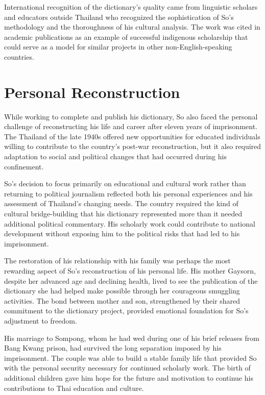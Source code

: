 \documentclass[
  Letterpaper,
]{scrbook}
\begin{document}
International recognition of the dictionary's quality came from
linguistic scholars and educators outside Thailand who recognized the
sophistication of So's methodology and the thoroughness of his cultural
analysis. The work was cited in academic publications as an example of
successful indigenous scholarship that could serve as a model for
similar projects in other non-English-speaking countries.

\section{Personal Reconstruction}\label{personal-reconstruction}

While working to complete and publish his dictionary, So also faced the
personal challenge of reconstructing his life and career after eleven
years of imprisonment. The Thailand of the late 1940s offered new
opportunities for educated individuals willing to contribute to the
country's post-war reconstruction, but it also required adaptation to
social and political changes that had occurred during his confinement.

So's decision to focus primarily on educational and cultural work rather
than returning to political journalism reflected both his personal
experiences and his assessment of Thailand's changing needs. The country
required the kind of cultural bridge-building that his dictionary
represented more than it needed additional political commentary. His
scholarly work could contribute to national development without exposing
him to the political risks that had led to his imprisonment.

The restoration of his relationship with his family was perhaps the most
rewarding aspect of So's reconstruction of his personal life. His mother
Gaysorn, despite her advanced age and declining health, lived to see the
publication of the dictionary she had helped make possible through her
courageous smuggling activities. The bond between mother and son,
strengthened by their shared commitment to the dictionary project,
provided emotional foundation for So's adjustment to freedom.

His marriage to Sompong, whom he had wed during one of his brief
releases from Bang Kwang prison, had survived the long separation
imposed by his imprisonment. The couple was able to build a stable
family life that provided So with the personal security necessary for
continued scholarly work. The birth of additional children gave him hope
for the future and motivation to continue his contributions to Thai
education and culture.
\end{document}
